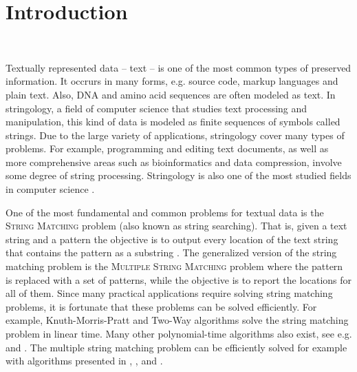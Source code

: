 \documentclass[english,twoside,censored,csm,algorithms-track-2020]{HYthesisML}
\theoremstyle{plain}
\theoremstyle{definition}
\begin{document}
%
%
%
%



\chapter{Introduction}~\label{chp-intro}


Textually represented data -- text -- is one of the most common types of preserved information.
It occrurs in many forms, e.g. source code, markup languages and plain text.
Also, DNA and amino acid sequences are often modeled as text.
In stringology, a field of computer science that studies text processing and manipulation,
this kind of data is modeled as finite sequences of symbols called strings.
Due to the large variety of applications, stringology cover many types of problems.
For example, programming and editing text documents, as well as more comprehensive areas such as
bioinformatics and data compression, involve some degree of string processing.
Stringology is also one of the most studied fields in computer science \citep{Crochemore03}.

One of the most fundamental and common problems for textual data is the \textsc{String Matching} problem
(also known as string searching). 
That is, given a text string and a pattern the objective is to output every location of
the text string that contains the pattern as a substring \citep{Gusfield97}.
The generalized version of the string
matching problem is the \textsc{Multiple String Matching} problem where the pattern is replaced
with a set of
patterns, while the objective is to report the locations for all of them.
Since many practical applications require solving string matching problems,
it is fortunate that these problems can be solved efficiently.
For example, Knuth-Morris-Pratt \citep{Knuth77} and Two-Way \citep{Crochemore91}
algorithms solve the string matching problem in linear time. Many other polynomial-time algorithms
also exist, see e.g. \citep{Karp87} and \citep{Horspool80}.
The multiple string matching problem can be efficiently solved for example with algorithms
presented in \citep{Aho75}, \citep{Navarro00}, \citep{Karp87} and \citep{CommentzWalter79}.
\end{document}
